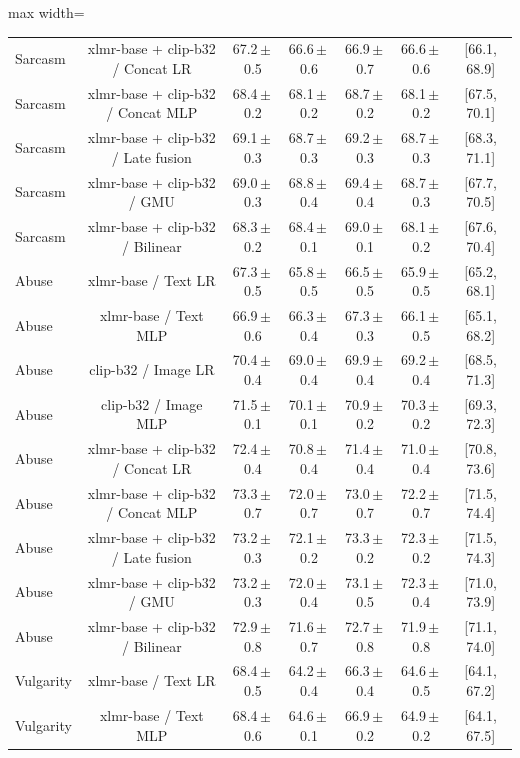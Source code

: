\begin{table}[t]
\begin{adjustbox}{max width=\textwidth}
\begin{tabular}{lcccccc}
Sarcasm & xlmr-base + clip-b32 / Concat LR & 67.2\,$\pm$\,0.5 & 66.6\,$\pm$\,0.6 & 66.9\,$\pm$\,0.7 & 66.6\,$\pm$\,0.6 & [66.1, 68.9] \\
Sarcasm & xlmr-base + clip-b32 / Concat MLP & 68.4\,$\pm$\,0.2 & 68.1\,$\pm$\,0.2 & 68.7\,$\pm$\,0.2 & 68.1\,$\pm$\,0.2 & [67.5, 70.1] \\
Sarcasm & xlmr-base + clip-b32 / Late fusion & 69.1\,$\pm$\,0.3 & 68.7\,$\pm$\,0.3 & 69.2\,$\pm$\,0.3 & 68.7\,$\pm$\,0.3 & [68.3, 71.1] \\
Sarcasm & xlmr-base + clip-b32 / GMU & 69.0\,$\pm$\,0.3 & 68.8\,$\pm$\,0.4 & 69.4\,$\pm$\,0.4 & 68.7\,$\pm$\,0.3 & [67.7, 70.5] \\
Sarcasm & xlmr-base + clip-b32 / Bilinear & 68.3\,$\pm$\,0.2 & 68.4\,$\pm$\,0.1 & 69.0\,$\pm$\,0.1 & 68.1\,$\pm$\,0.2 & [67.6, 70.4] \\
Abuse & xlmr-base / Text LR & 67.3\,$\pm$\,0.5 & 65.8\,$\pm$\,0.5 & 66.5\,$\pm$\,0.5 & 65.9\,$\pm$\,0.5 & [65.2, 68.1] \\
Abuse & xlmr-base / Text MLP & 66.9\,$\pm$\,0.6 & 66.3\,$\pm$\,0.4 & 67.3\,$\pm$\,0.3 & 66.1\,$\pm$\,0.5 & [65.1, 68.2] \\
Abuse & clip-b32 / Image LR & 70.4\,$\pm$\,0.4 & 69.0\,$\pm$\,0.4 & 69.9\,$\pm$\,0.4 & 69.2\,$\pm$\,0.4 & [68.5, 71.3] \\
Abuse & clip-b32 / Image MLP & 71.5\,$\pm$\,0.1 & 70.1\,$\pm$\,0.1 & 70.9\,$\pm$\,0.2 & 70.3\,$\pm$\,0.2 & [69.3, 72.3] \\
Abuse & xlmr-base + clip-b32 / Concat LR & 72.4\,$\pm$\,0.4 & 70.8\,$\pm$\,0.4 & 71.4\,$\pm$\,0.4 & 71.0\,$\pm$\,0.4 & [70.8, 73.6] \\
Abuse & xlmr-base + clip-b32 / Concat MLP & 73.3\,$\pm$\,0.7 & 72.0\,$\pm$\,0.7 & 73.0\,$\pm$\,0.7 & 72.2\,$\pm$\,0.7 & [71.5, 74.4] \\
Abuse & xlmr-base + clip-b32 / Late fusion & 73.2\,$\pm$\,0.3 & 72.1\,$\pm$\,0.2 & 73.3\,$\pm$\,0.2 & 72.3\,$\pm$\,0.2 & [71.5, 74.3] \\
Abuse & xlmr-base + clip-b32 / GMU & 73.2\,$\pm$\,0.3 & 72.0\,$\pm$\,0.4 & 73.1\,$\pm$\,0.5 & 72.3\,$\pm$\,0.4 & [71.0, 73.9] \\
Abuse & xlmr-base + clip-b32 / Bilinear & 72.9\,$\pm$\,0.8 & 71.6\,$\pm$\,0.7 & 72.7\,$\pm$\,0.8 & 71.9\,$\pm$\,0.8 & [71.1, 74.0] \\
Vulgarity & xlmr-base / Text LR & 68.4\,$\pm$\,0.5 & 64.2\,$\pm$\,0.4 & 66.3\,$\pm$\,0.4 & 64.6\,$\pm$\,0.5 & [64.1, 67.2] \\
Vulgarity & xlmr-base / Text MLP & 68.4\,$\pm$\,0.6 & 64.6\,$\pm$\,0.1 & 66.9\,$\pm$\,0.2 & 64.9\,$\pm$\,0.2 & [64.1, 67.5] \\

\end{tabular}
\end{adjustbox}
\end{table}
